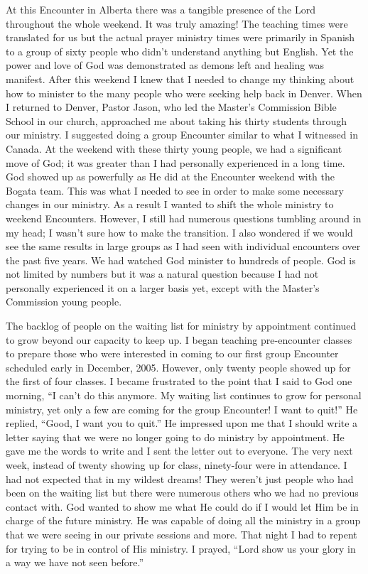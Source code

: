 \documentclass[oneside]{book}
\begin{document}
At this Encounter in Alberta there was a tangible presence of the Lord throughout the whole weekend. It was truly amazing! The teaching times were translated for us but the actual prayer ministry times were primarily in Spanish to a group of sixty people who didn’t understand anything but English. Yet the power and love of God was demonstrated as demons left and healing was manifest. After this weekend I knew that I needed to change my thinking about how to minister to the many people who were seeking help back in Denver. When I returned to Denver, Pastor Jason, who led the Master’s Commission Bible School in our church, approached me about taking his thirty students through our ministry.  I suggested doing a group Encounter similar to what I witnessed in Canada. At the weekend with these thirty young people, we had a significant move of God; it was greater than I had personally experienced in a long time. God showed up as powerfully as He did at the Encounter weekend with the Bogata team. This was what I needed to see in order to make some necessary changes in our ministry. As a result I wanted to shift the whole ministry to weekend Encounters. However, I still had numerous questions tumbling around in my head; I wasn’t sure how to make the transition. I also wondered if we would see the same results in large groups as I had seen with individual encounters over the past five years. We had watched God minister to hundreds of people. God is not limited by numbers but it was a natural question because I had not personally experienced it on a larger basis yet, except with the Master’s Commission young people.  

The backlog of people on the waiting list for ministry by appointment continued to grow beyond our capacity to keep up. I began teaching pre-encounter classes to prepare those who were interested in coming to our first group Encounter scheduled early in December, 2005. However, only twenty people showed up for the first of four classes. I became frustrated to the point that I said to God one morning, “I can’t do this anymore. My waiting list continues to grow for personal ministry, yet only a few are coming for the group Encounter! I want to quit!” He replied, “Good, I want you to quit.” He impressed upon me that I should write a letter saying that we were no longer going to do ministry by appointment.  He gave me the words to write and I sent the letter out to everyone. The very next week, instead of twenty showing up for class, ninety-four were in attendance. I had not expected that in my wildest dreams! They weren’t just people who had been on the waiting list but there were numerous others who we had no previous contact with. God wanted to show me what He could do if I would let Him be in charge of the future ministry. He was capable of doing all the ministry in a group that we were seeing in our private sessions and more. That night I had to repent for trying to be in control of His ministry. I prayed, “Lord show us your glory in a way we have not seen before.” 
\end{document}
